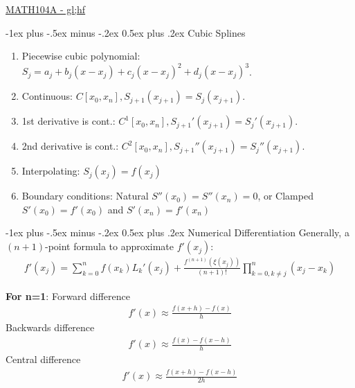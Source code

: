 \documentclass[10pt,landscape]{article}
\makeatletter
\renewcommand{\section}{\@startsection{section}{1}{0mm}%
                                {-1ex plus -.5ex minus -.2ex}%
                                {0.5ex plus .2ex}%
                                {\normalfont\large\bfseries}}
\makeatother
\begin{document}
\raggedright
\footnotesize
\begin{multicols}{3}


\setlength{\premulticols}{1pt}
\setlength{\postmulticols}{1pt}
\setlength{\multicolsep}{1pt}
\setlength{\columnsep}{2pt}

\begin{center}
     \Large{\underline{MATH104A - gl;hf}} \\
\end{center}

\section{Cubic Splines}
\begin{enumerate}
\item Piecewise cubic polynomial: 
$S_{j} = a_{j} + b_{j}(x-x_{j}) + c_{j}(x-x_{j})^{2} +
d_{j}(x-x_{j})^{3}$.
\item Continuous: $C[x_{0},x_{n}], S_{j+1}(x_{j+1}) = S_{j}(x_{j+1})$. 
\item 1st derivative is cont.: $C^{1}[x_{0},x_{n}], S_{j+1}'(x_{j+1}) =
S_{j}'(x_{j+1})$.
\item 2nd derivative is cont.: $C^{2}[x_{0},x_{n}], S_{j+1}''(x_{j+1}) =
S_{j}''(x_{j+1})$.
\item Interpolating: $S_{j}(x_{j}) = f(x_{j})$
\item Boundary conditions: Natural $S''(x_{0}) = S''(x_{n}) = 0$,
or Clamped $S'(x_{0}) = f'(x_{0})$ and $S'(x_{n}) = f'(x_{n})$
\end{enumerate}

\section{Numerical Differentiation}
Generally, a $(n+1)$-point formula to approximate $f'(x_{j})$:
\begin{align*}
  f'(x_{j}) = \sum_{k=0}^{n}f(x_{k}) L_{k}'(x_{j}) + 
  \frac{f^{(n+1)}(\xi(x_{j}))}{(n+1)!} \prod_{k=0, k\neq j}^{n}(x_{j}
  - x_{k})
\end{align*}

\textbf{For n=1}: Forward difference
\begin{align*}
  f'(x) \approx \frac{f(x+h) - f(x)}{h}
\end{align*}
Backwards difference
\begin{align*}
  f'(x) \approx  \frac{f(x) -f(x-h)}{h}
\end{align*}
Central difference
\begin{align*}
  f'(x) \approx \frac{f(x+h) - f(x-h)}{2h}
\end{align*}


\end{multicols}
\end{document}
